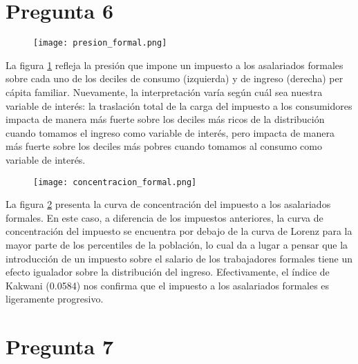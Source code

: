 \documentclass[11pt,oneside]{article}
\begin{document}
	
 	\section*{Pregunta 6}

 	\begin{figure}
    		\centering
    		\texttt{[image: presion\_formal.png]}
    		\label{fig:6A}
	\end{figure}

	La figura \ref{fig:6A} refleja la presión que impone un impuesto a los asalariados formales sobre cada uno de los deciles de consumo (izquierda) y de ingreso (derecha) per cápita familiar. Nuevamente, la interpretación varía según cuál sea nuestra variable de interés: la traslación total de la carga del impuesto a los consumidores impacta de manera más fuerte sobre los deciles más ricos de la distribución cuando tomamos el ingreso como variable de interés, pero impacta de manera más fuerte sobre los deciles más pobres cuando tomamos al consumo como variable de interés.

	\begin{figure}
    		\centering
    		\texttt{[image: concentracion\_formal.png]}
    		\label{fig:6B}
	\end{figure}

	La figura \ref{fig:6B} presenta la curva de concentración del impuesto a los asalariados formales. En este caso, a diferencia de los impuestos anteriores, la curva de concentración del impuesto se encuentra por debajo de la curva de Lorenz para la mayor parte de los percentiles de la población, lo cual da a lugar a pensar que la introducción de un impuesto sobre el salario de los trabajadores formales tiene un efecto igualador sobre la distribución del ingreso. Efectivamente, el índice de Kakwani (0.0584) nos confirma que el impuesto a los asalariados formales es ligeramente progresivo.
	
	\section*{Pregunta 7}
	
	
	
	
	
	
	
\end{document}
